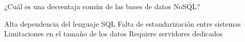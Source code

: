 \question[1] ¿Cuál es una desventaja común de las bases de datos NoSQL?
\begin{choices}
\choice Alta dependencia del lenguaje SQL
\CorrectChoice Falta de estandarización entre sistemas
\choice Limitaciones en el tamaño de los datos
\choice Requiere servidores dedicados
\end{choices}